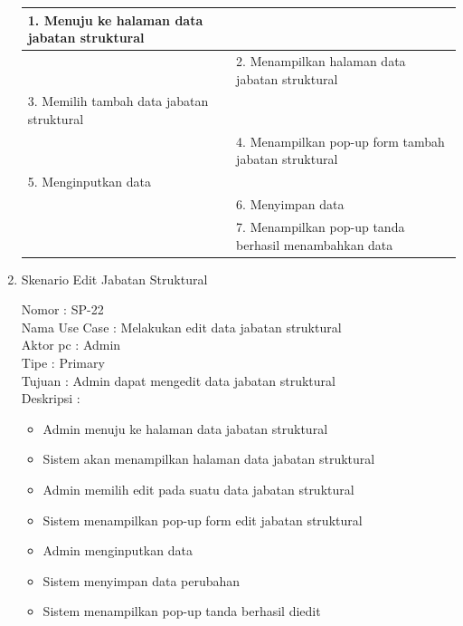 \begin{enumerate}
\begin{table}
\begin{tabular}{ | p{60mm} | p{68mm} |}
		1.	Menuju ke halaman data jabatan struktural &  \\
		
		\hline
		
		&  2.	Menampilkan halaman data jabatan struktural\\
		
		\hline
		
		3. Memilih tambah data jabatan struktural& \\
		
		\hline
		
		& 4.	Menampilkan pop-up form tambah jabatan struktural\\
		
		\hline
		
		5.	Menginputkan data  & \\
		\hline
		
		& 6.	Menyimpan data \\
		\hline
		
		& 7.	Menampilkan pop-up tanda berhasil menambahkan data \\
		\hline
		
	\end{tabular}
\end{table}

\item Skenario Edit Jabatan Struktural

Nomor \kern 3.6pc : SP-22 \\
Nama Use Case : Melakukan edit data jabatan struktural \\
Aktor  pc : Admin \\
Tipe \kern 4.6pc : Primary \\
Tujuan \kern 3.6pc : Admin dapat mengedit data jabatan struktural\\
Deskripsi \kern 2.5pc : 

\begin{itemize}
	\item Admin menuju ke halaman data jabatan struktural
	\item Sistem akan menampilkan halaman data jabatan struktural
	\item Admin memilih edit pada suatu data jabatan struktural
	\item Sistem menampilkan pop-up form edit jabatan struktural
	\item Admin menginputkan data
	\item Sistem menyimpan data perubahan
	\item Sistem menampilkan pop-up tanda berhasil diedit
	

\end{itemize}
\end{enumerate}
